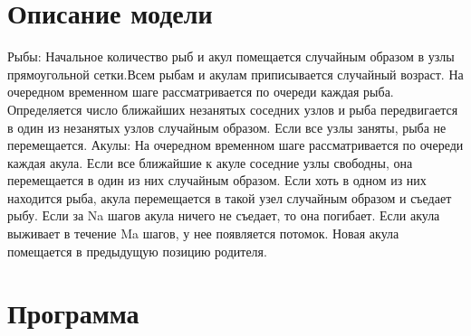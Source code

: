 \documentclass[14pt]{extarticle}
\begin{document}
\section{Описание модели}
Рыбы: Начальное количество рыб и акул помещается случайным образом в
узлы прямоугольной сетки.Всем рыбам и акулам приписывается случайный
возраст. На очередном временном шаге рассматривается по очереди каждая
рыба. Определяется число ближайших незанятых соседних узлов и рыба
передвигается в один из незанятых узлов случайным образом. Если все
узлы заняты, рыба не перемещается.
Акулы: На очередном временном шаге рассматривается по очереди каждая акула. Если все ближайшие к акуле соседние узлы свободны, она перемещается в один из них случайным образом. Если хоть в одном из них
находится рыба, акула перемещается в такой узел случайным образом и
съедает рыбу. Если за Na шагов акула ничего не съедает, то она погибает. Если акула выживает в течение Ma шагов, у нее появляется потомок.
Новая акула помещается в предыдущую позицию родителя.


\newpage
\section{Программа}
\end{document}
